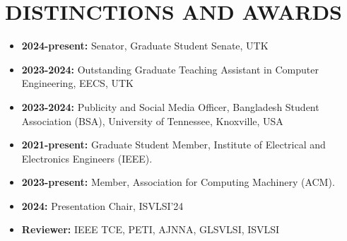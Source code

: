 \documentclass[margin]{res}
\begin{document}
\begin{resume}
\begin{itemize}
\end{itemize}

\section{DISTINCTIONS AND AWARDS}
\begin{itemize}
\item \textbf{2024-present:} Senator, Graduate Student Senate, UTK
\item \textbf{2023-2024:} Outstanding Graduate Teaching Assistant in Computer Engineering, EECS, UTK
\item \textbf{2023-2024:} Publicity and Social Media Officer, Bangladesh Student Association (BSA), University of Tennessee, Knoxville, USA
\item \textbf{2021-present:} Graduate Student Member, Institute of Electrical and Electronics Engineers (IEEE).
\item \textbf{2023-present:} Member, Association for Computing Machinery (ACM).
\item \textbf{2024:} Presentation Chair, ISVLSI'24
\item \textbf{Reviewer:} IEEE TCE, PETI, AJNNA, GLSVLSI, ISVLSI

\end{itemize}
\end{resume}
\end{document}
